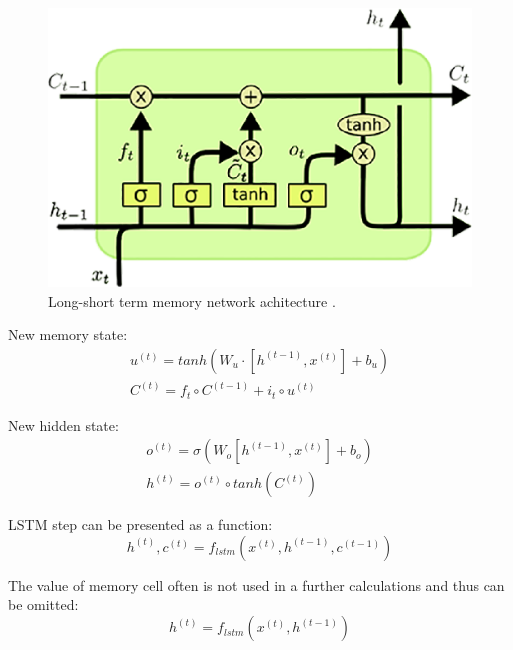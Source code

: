 \begin{figure}[h]
\centering
\includegraphics{Figures/lstm}
\decoRule
\caption[Long-short term memory]{Long-short term memory network achitecture \parencite{lstm-picture}.}
\label{fig:word_embeddings}
\end{figure}

New memory state:
\begin{equation}
\begin{gathered}
u^{(t)} = tanh(W_u\cdot[h^{(t-1)}, x^{(t)}]+b_u) \\

C^{(t)} = f_t\circ C^{(t-1)}+i_t\circ u^{(t)}
\end{gathered}
\label{lstm:c}
\end{equation} 

New hidden state:
\begin{equation}
\begin{gathered}
o^{(t)}=\sigma(W_o[h^{(t-1)},x^{(t)}]+b_o) \\

h^{(t)}=o^{(t)}\circ tanh(C^{(t)})
\end{gathered}
\label{lstm:h}
\end{equation} 

LSTM step can be presented as a function:
\begin{equation}
h^{(t)}, c^{(t)} = f_{lstm}(x^{(t)}, h^{(t-1)}, c^{(t-1)})
\end{equation}

The value of memory cell often is not used in a further calculations and thus can be omitted:
\begin{equation}
h^{(t)} = f_{lstm}(x^{(t)}, h^{(t-1)})
\end{equation}

